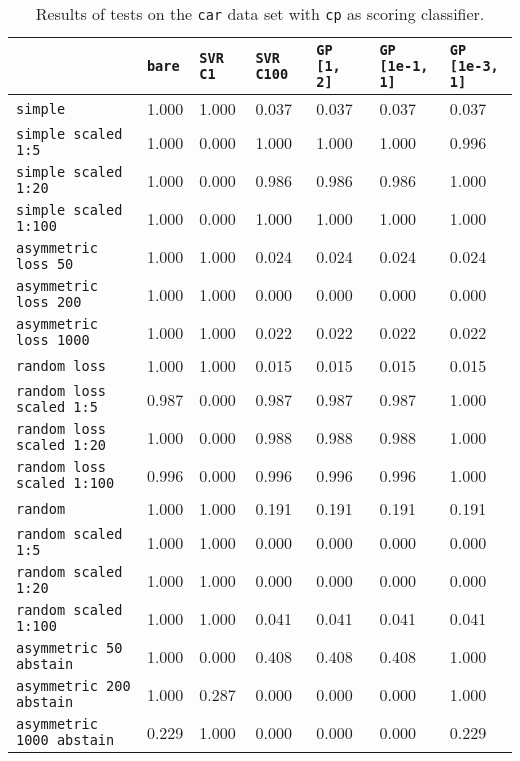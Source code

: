 \begin{table}
{\scriptsize
\begin{tabu}{l|l|l|l|l|l|l}
&\texttt{bare} &\texttt{SVR C1} &\texttt{SVR C100} &\texttt{GP [1, 2]} &\texttt{GP [1e-1, 1]} &\texttt{GP [1e-3, 1]}  \\
\hline
\texttt{simple} &1.000 &1.000 &0.037 &0.037 &0.037 &0.037 \\
\texttt{simple scaled 1:5} &1.000 &0.000 &1.000 &1.000 &1.000 &0.996 \\
\texttt{simple scaled 1:20} &1.000 &0.000 &0.986 &0.986 &0.986 &1.000 \\
\texttt{simple scaled 1:100} &1.000 &0.000 &1.000 &1.000 &1.000 &1.000 \\
\texttt{asymmetric loss 50} &1.000 &1.000 &0.024 &0.024 &0.024 &0.024 \\
\texttt{asymmetric loss 200} &1.000 &1.000 &0.000 &0.000 &0.000 &0.000 \\
\texttt{asymmetric loss 1000} &1.000 &1.000 &0.022 &0.022 &0.022 &0.022 \\
\texttt{random loss} &1.000 &1.000 &0.015 &0.015 &0.015 &0.015 \\
\texttt{random loss scaled 1:5} &0.987 &0.000 &0.987 &0.987 &0.987 &1.000 \\
\texttt{random loss scaled 1:20} &1.000 &0.000 &0.988 &0.988 &0.988 &1.000 \\
\texttt{random loss scaled 1:100} &0.996 &0.000 &0.996 &0.996 &0.996 &1.000 \\
\texttt{random} &1.000 &1.000 &0.191 &0.191 &0.191 &0.191 \\
\texttt{random scaled 1:5} &1.000 &1.000 &0.000 &0.000 &0.000 &0.000 \\
\texttt{random scaled 1:20} &1.000 &1.000 &0.000 &0.000 &0.000 &0.000 \\
\texttt{random scaled 1:100} &1.000 &1.000 &0.041 &0.041 &0.041 &0.041 \\
\texttt{asymmetric 50 abstain} &1.000 &0.000 &0.408 &0.408 &0.408 &1.000 \\
\texttt{asymmetric 200 abstain} &1.000 &0.287 &0.000 &0.000 &0.000 &1.000 \\
\texttt{asymmetric 1000 abstain} &0.229 &1.000 &0.000 &0.000 &0.000 &0.229 \\
\end{tabu} }
\caption{Results of tests on the \texttt{car} data set
         with \texttt{cp} as scoring classifier.}
\end{table}

